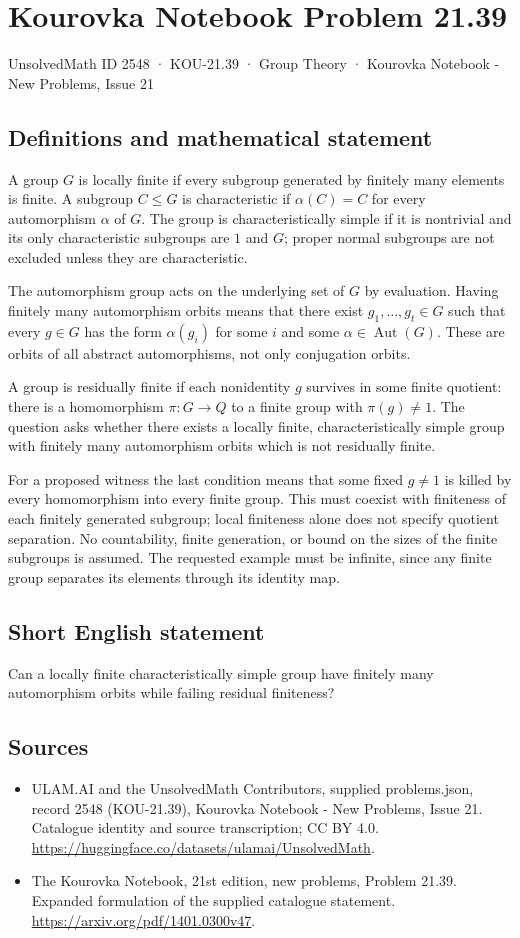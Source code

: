 \documentclass[11pt,a4paper]{article}
\begin{document}
\section*{Kourovka Notebook Problem 21.39}\label{2548}
{\small UnsolvedMath ID 2548 · KOU-21.39 · Group Theory · Kourovka Notebook - New Problems, Issue 21}
\subsection{Definitions and mathematical statement}
A group $G$ is locally finite if every subgroup generated by finitely
many elements is finite. A subgroup $C\le G$ is characteristic if
$\alpha(C)=C$ for every automorphism $\alpha$ of $G$.
The group is characteristically simple if it is nontrivial and its only
characteristic subgroups are $1$ and $G$; proper normal subgroups are
not excluded unless they are characteristic.

The automorphism group acts on the underlying set of $G$ by evaluation.
Having finitely many automorphism orbits means that there exist
$g_1,\ldots,g_t\in G$ such that every $g\in G$ has the form
$\alpha(g_i)$ for some $i$ and some $\alpha\in\operatorname{Aut}(G)$.
These are orbits of all abstract automorphisms, not only conjugation
orbits.

A group is residually finite if each nonidentity $g$ survives in some
finite quotient: there is a homomorphism $\pi:G\to Q$ to a finite group
with $\pi(g)\ne1$. The question asks whether there exists a locally
finite, characteristically simple group with finitely many automorphism
orbits which is not residually finite.

For a proposed witness the last condition means that some fixed
$g\ne1$ is killed by every homomorphism into every finite group.
This must coexist with finiteness of each finitely generated subgroup;
local finiteness alone does not specify quotient separation. No countability,
finite generation, or bound on the sizes of the finite subgroups is
assumed. The requested example must be infinite, since any finite group
separates its elements through its identity map.
\subsection{Short English statement}
Can a locally finite characteristically simple group have finitely many automorphism orbits while failing residual finiteness?
\subsection{Sources}
\begin{itemize}
\item[S1] ULAM.AI and the UnsolvedMath Contributors, supplied problems.json, record 2548 (KOU-21.39), Kourovka Notebook - New Problems, Issue 21. Catalogue identity and source transcription; CC BY 4.0.
\url{https://huggingface.co/datasets/ulamai/UnsolvedMath}.
\item[S2] The Kourovka Notebook, 21st edition, new problems, Problem 21.39. Expanded formulation of the supplied catalogue statement.
\url{https://arxiv.org/pdf/1401.0300v47}.
\end{itemize}
\end{document}
